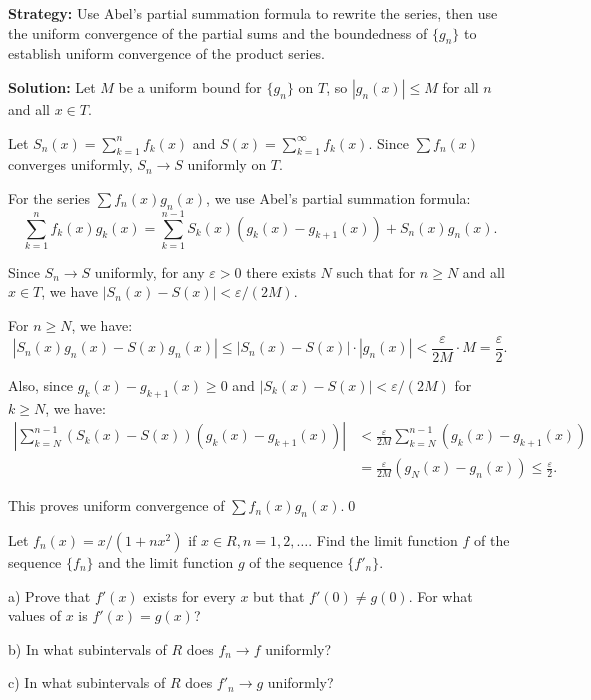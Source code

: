 \noindent\textbf{Strategy:} Use Abel's partial summation formula to rewrite the series, then use the uniform convergence of the partial sums and the boundedness of \( \{g_n\} \) to establish uniform convergence of the product series.

\bigskip\noindent\textbf{Solution:} Let \( M \) be a uniform bound for \( \{g_n\} \) on \( T \), so \( |g_n(x)| \leq M \) for all \( n \) and all \( x \in T \).

Let \( S_n(x) = \sum_{k=1}^n f_k(x) \) and \( S(x) = \sum_{k=1}^{\infty} f_k(x) \). Since \( \sum f_n(x) \) converges uniformly, \( S_n \to S \) uniformly on \( T \).

For the series \( \sum f_n(x)g_n(x) \), we use Abel's partial summation formula:
\[\sum_{k=1}^n f_k(x)g_k(x) = \sum_{k=1}^{n-1} S_k(x)(g_k(x) - g_{k+1}(x)) + S_n(x)g_n(x).\]

Since \( S_n \to S \) uniformly, for any \( \varepsilon > 0 \) there exists \( N \) such that for \( n \geq N \) and all \( x \in T \), we have \( |S_n(x) - S(x)| < \varepsilon/(2M) \).

For \( n \geq N \), we have:
\[|S_n(x)g_n(x) - S(x)g_n(x)| \leq |S_n(x) - S(x)| \cdot |g_n(x)| < \frac{\varepsilon}{2M} \cdot M = \frac{\varepsilon}{2}.\]

Also, since \( g_k(x) - g_{k+1}(x) \geq 0 \) and \( |S_k(x) - S(x)| < \varepsilon/(2M) \) for \( k \geq N \), we have:
\begin{align*}
\left|\sum_{k=N}^{n-1} (S_k(x) - S(x))(g_k(x) - g_{k+1}(x))\right| &< \frac{\varepsilon}{2M} \sum_{k=N}^{n-1} (g_k(x) - g_{k+1}(x)) \\
&= \frac{\varepsilon}{2M}(g_N(x) - g_n(x)) \leq \frac{\varepsilon}{2}.
\end{align*}

This proves uniform convergence of \( \sum f_n(x)g_n(x) \).\qed


\begin{problembox}
Let \( f_n(x) = x/(1 + nx^2) \) if \( x \in R, n = 1, 2, \ldots \). Find the limit function \( f \) of the sequence \(\{f_n\}\) and the limit function \( g \) of the sequence \(\{f'_n\}\).

a) Prove that \( f'(x) \) exists for every \( x \) but that \( f'(0) \neq g(0) \). For what values of \( x \) is \( f'(x) = g(x) \)?

b) In what subintervals of \( R \) does \( f_n \to f \) uniformly?

c) In what subintervals of \( R \) does \( f'_n \to g \) uniformly?
\end{problembox}

